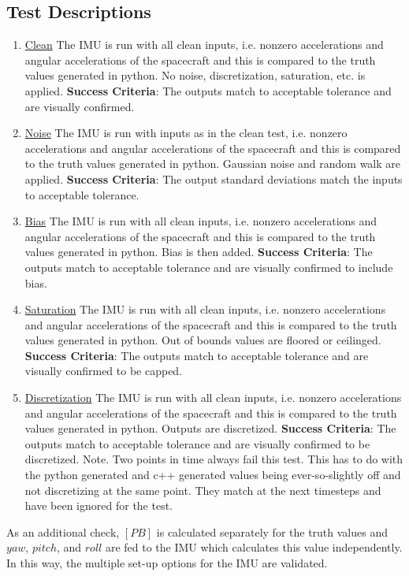 \subsection{Test Descriptions}
\begin{enumerate}
	\item \underline{Clean} The IMU is run with all clean inputs, i.e. nonzero accelerations and angular accelerations of the spacecraft and this is compared to the truth values generated in python. No noise, discretization, saturation, etc. is applied.
	\subitem \textbf{Success Criteria}: The outputs match to acceptable tolerance and are visually confirmed.
	\item \underline{Noise} The IMU is run with inputs as in the clean test, i.e. nonzero accelerations and angular accelerations of the spacecraft and this is compared to the truth values generated in python. Gaussian noise and random walk are applied.
	\subitem \textbf{Success Criteria}: The output standard deviations match the inputs to acceptable tolerance.
	\item \underline{Bias} The IMU is run with all clean inputs, i.e. nonzero accelerations and angular accelerations of the spacecraft and this is compared to the truth values generated in python. Bias is then added.
	\subitem \textbf{Success Criteria}: The outputs match to acceptable tolerance and are visually confirmed to include bias.
	\item \underline{Saturation} The IMU is run with all clean inputs, i.e. nonzero accelerations and angular accelerations of the spacecraft and this is compared to the truth values generated in python. Out of bounds values are floored or ceilinged.
	\subitem \textbf{Success Criteria}: The outputs match to acceptable tolerance and are visually confirmed to be capped.
	\item \underline{Discretization} The IMU is run with all clean inputs, i.e. nonzero accelerations and angular accelerations of the spacecraft and this is compared to the truth values generated in python. Outputs are discretized.
	\subitem \textbf{Success Criteria}: The outputs match to acceptable tolerance and are visually confirmed to be discretized. Note. Two points in time always fail this test. This has to do with the python generated and c++ generated values being ever-so-slightly off and not discretizing at the same point. They match at the next timesteps and have been ignored for the test.
\end{enumerate} 
As an additional check, $[PB]$ is calculated separately for the truth values and $yaw$, $pitch$, and $roll$ are fed to the IMU which calculates this value independently. In this way, the multiple set-up options for the IMU are validated.


